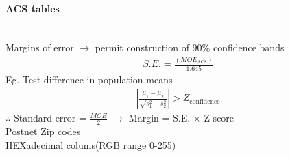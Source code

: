 \paragraph{ACS tables}~\\
Margins of error $\to$ permit construction of 90\% confidence bands
\begin{eqnarray*}
S.E. = \frac{(MOE_{\text{ACS}})}{1.645}
\end{eqnarray*}
Eg. Test difference in population means
\begin{eqnarray*}
\left| \frac{\mu_{1}-\mu_{2}}{\sqrt{s_{1}^{2}+s_{2}^{2}}} \right| > Z_{\text{confidence}}
\end{eqnarray*}
$\therefore$ Standard error = $\frac{MOE}{2}$  $\to$  Margin = S.E. $\times$ Z-score\\
Postnet Zip codes\\
HEXadecimal colums(RGB range 0-255)

